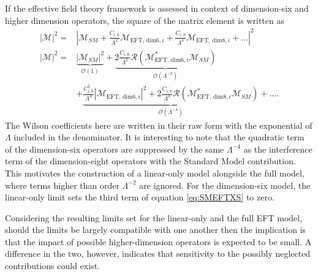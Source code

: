 If the effective field theory framework is assessed in context of dimension-six and higher dimension operators, the square of the matrix element is written as 
\begin{equation}
  \begin{aligned}
  \left|\mathcal M\right|^2 =& \left| \mathcal M_{SM} + \frac{C_{i,6}}{\Lambda^{2}} \mathcal M_{\text{EFT, dim6},i}  + \frac{C_{i,8}}{\Lambda^{4}} \mathcal M_{\text{EFT, dim8},i} + \ldots \right|^2 \\
  \left|\mathcal M\right|^2 =& \underbrace{\left|\mathcal M_{SM}\right|^2}_{\mathcal{O}(1)} +  
  \underbrace{2 \frac{C_{i,6}}{\Lambda^{2}} \mathcal{R} \left(\mathcal M_{\text{EFT, dim6},i}^{\ast} \mathcal M_{SM} \right)}_{\mathcal{O}(\Lambda^{-2})}   \\ 
  &  + \underbrace{
      \frac{C_{i,6}^2}{\Lambda^{4}} \left| \mathcal M_{\text{EFT, dim6},i} \right|^2
      + 2 \frac{C_{i,8}}{\Lambda^{4}} \mathcal{R} \left(\mathcal M_{\text{EFT, dim8},i}^{\ast} \mathcal M_{SM} \right)
    }_{\mathcal{O}(\Lambda^{-4})} +  \ldots . 
  \end{aligned}
\end{equation}
The Wilson coefficients here are written in their raw form with the exponential of $\Lambda$ included in the denominator. It is interesting to note that the quadratic term of the dimension-six operators are suppressed by the same $\Lambda^{-4}$ as the interference term of the dimension-eight operators with the Standard Model contribution. This motivates the construction of a linear-only model alongside the full model, where terms higher than order $\Lambda^{-2}$ are ignored. For the dimension-six model, the linear-only limit sets the third term of equation \ref{eq:SMEFTXS} to zero. 

Considering the resulting limits set for the linear-only and the full EFT model, should the limits be largely compatible with one another then the implication is that the impact of possible higher-dimension operators is expected to be small. A difference in the two, however, indicates that sensitivity to the possibly neglected contributions could exist.

